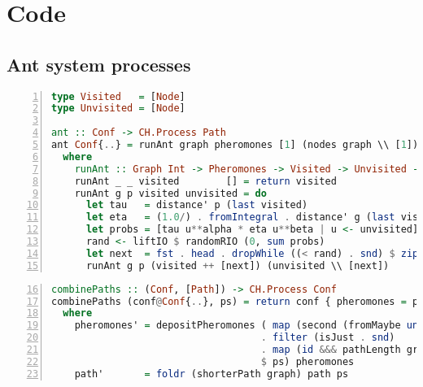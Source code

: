 \chapter{Code}

\begin{landscape}
\section{Ant system processes}
\label{app:ant_system_processes}

\begin{lstlisting}[language=Haskell,frame=tb,numbers=left,caption=Type aliases and the implementation of ants as a \textsf{Cloud Haskell} process that returns a path.]
type Visited   = [Node]
type Unvisited = [Node]

ant :: Conf -> CH.Process Path
ant Conf{..} = runAnt graph pheromones [1] (nodes graph \\ [1])
  where
    runAnt :: Graph Int -> Pheromones -> Visited -> Unvisited -> CH.Process Path
    runAnt _ _ visited        [] = return visited
    runAnt g p visited unvisited = do
      let tau   = distance' p (last visited)
      let eta   = (1.0/) . fromIntegral . distance' g (last visited)
      let probs = [tau u**alpha * eta u**beta | u <- unvisited]
      rand <- liftIO $ randomRIO (0, sum probs)
      let next  = fst . head . dropWhile ((< rand) . snd) $ zip unvisited (scanl1 (+) probs)
      runAnt g p (visited ++ [next]) (unvisited \\ [next])
\end{lstlisting}


\begin{lstlisting}[language=Haskell,frame=tb,numbers=left,caption=Implementation of a combinator process for paths as \textsf{Cloud Haskell} process.,firstnumber=16]
combinePaths :: (Conf, [Path]) -> CH.Process Conf
combinePaths (conf@Conf{..}, ps) = return conf { pheromones = pheromones', path = path' }
  where
    pheromones' = depositPheromones ( map (second (fromMaybe undefined))
                                    . filter (isJust . snd)
                                    . map (id &&& pathLength graph)
                                    $ ps) pheromones
    path'       = foldr (shorterPath graph) path ps
\end{lstlisting}

\end{landscape}